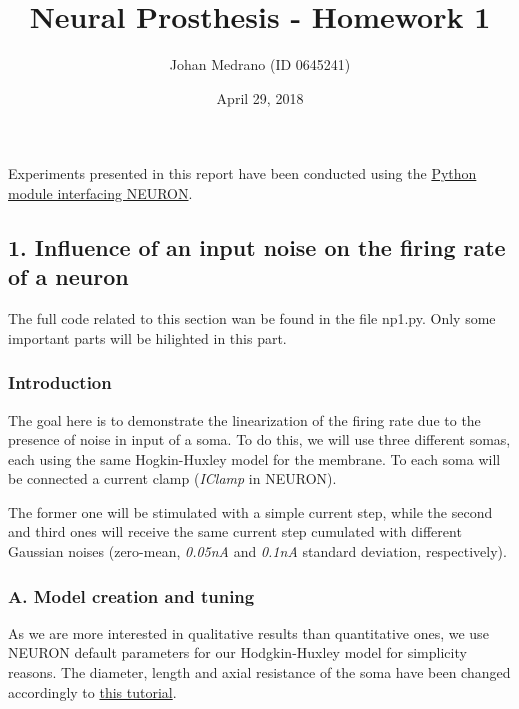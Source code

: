 \documentclass[]{article}
\title{Neural Prosthesis - Homework 1}
\date{April 29, 2018}
\author{Johan Medrano (ID 0645241)}
\begin{document}
    
\maketitle



Experiments presented in this report have been conducted using the
\href{https://neuron.yale.edu/neuron/static/docs/neuronpython/}{Python
module interfacing NEURON}.

\hypertarget{influence-of-an-input-noise-on-the-firing-rate-of-a-neuron}{%
\subsection{1. Influence of an input noise on the firing rate of a
neuron}\label{influence-of-an-input-noise-on-the-firing-rate-of-a-neuron}}

The full code related to this section wan be found in the file np1.py.
Only some important parts will be hilighted in this part.

\hypertarget{introduction}{%
\subsubsection{Introduction}\label{introduction}}

The goal here is to demonstrate the linearization of the firing rate due
to the presence of noise in input of a soma. To do this, we will use
three different somas, each using the same Hogkin-Huxley model for the
membrane. To each soma will be connected a current clamp (\emph{IClamp}
in NEURON).

The former one will be stimulated with a simple current step, while the
second and third ones will receive the same current step cumulated with
different Gaussian noises (zero-mean, \emph{0.05nA} and \emph{0.1nA}
standard deviation, respectively).

\hypertarget{a.-model-creation-and-tuning}{%
\subsubsection{A. Model creation and
tuning}\label{a.-model-creation-and-tuning}}

As we are more interested in qualitative results than quantitative ones,
we use NEURON default parameters for our Hodgkin-Huxley model for
simplicity reasons. The diameter, length and axial resistance of the
soma have been changed accordingly to
\href{http://web.mit.edu/neuron_v7.4/nrntuthtml/tutorial/tutA.html}{this
tutorial}.
\end{document}
